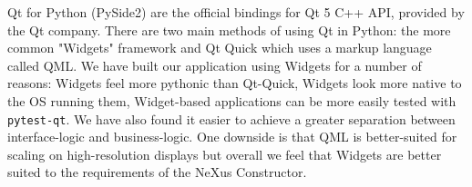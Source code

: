 Qt for Python (PySide2) are the official bindings for Qt 5 C++ API, provided by the Qt company. There are two main methods of using Qt in Python: the more common "Widgets" framework and Qt Quick which uses a markup language called QML. We have built our application using Widgets for a number of reasons: Widgets feel more pythonic than Qt-Quick, Widgets look more native to the OS running them, Widget-based applications can be more easily tested with \texttt{pytest-qt}. We have also found it easier to achieve a greater separation between interface-logic and business-logic. One downside is that QML is better-suited for scaling on high-resolution displays but overall we feel that Widgets are better suited to the requirements of the NeXus Constructor.
\iffalse
\bigskip
The code snippet below shows the usage of a typical Qt3D view in python. Qt3D provides some high-level geometry types for adding cylinders, meshes, spheres as well as several other shapes. This is all wrapping OpenGL, and in the future Qt have stated they will support other graphics engines such as DirectX12, Vulkan and Metal. Currently there is some limited support for vulkan using the QVulkanWindow with a QVulkanInstance.
\fi
